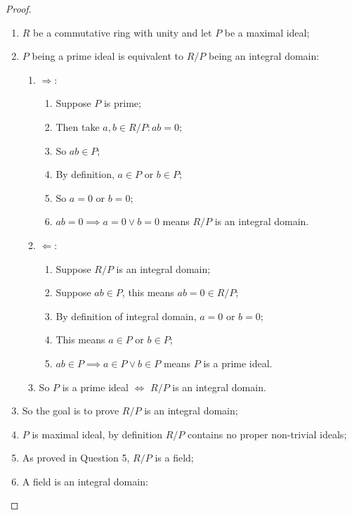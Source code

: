 \documentclass{article}
\begin{document}
\begin{proof}
~
    \begin{enumerate}
        \item $R$ be a commutative ring with unity and let $P$ be a maximal ideal;
        \item $P$ being a prime ideal is equivalent to $R/P$ being an integral domain:
        \begin{enumerate}
            \item $\Rightarrow$:
            \begin{enumerate}
                \item Suppose $P$ is prime;
                \item Then take $a,b\in R/P:ab=0$;
                \item So $ab\in P$;
                \item By definition, $a\in P$ or $b\in P$;
                \item So $a=0$ or $b=0$;
                \item $ab=0\implies a=0\lor b=0$ means $R/P$ is an integral domain.
            \end{enumerate}
            \item $\Leftarrow$:
            \begin{enumerate}
                \item Suppose $R/P$ is an integral domain;
                \item Suppose $ab\in P$, this means $ab=0\in R/P$;
                \item By definition of integral domain, $a=0$ or $b=0$;
                \item This means $a\in P$ or $b\in P$;
                \item $ab\in P\implies a\in P\lor b\in P$ means $P$ is a prime ideal.
            \end{enumerate}
            \item So $P$ is a prime ideal $\Leftrightarrow$ $R/P$ is an integral domain.
        \end{enumerate}
        \item So the goal is to prove $R/P$ is an integral domain;
        \item $P$ is maximal ideal, by definition $R/P$ contains no proper non-trivial ideals;
        \item As proved in Question 5, $R/P$ is a field;
        \item A field is an integral domain:
        \begin{enumerate}

\end{enumerate}
\end{enumerate}
\end{proof}
\end{document}

